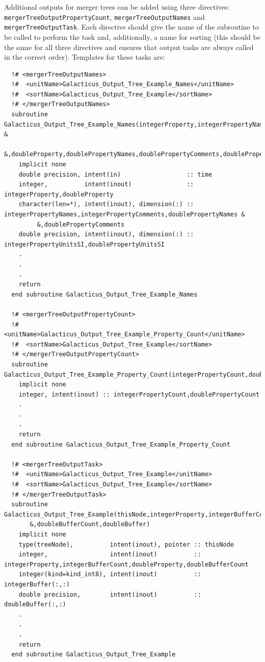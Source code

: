 Additional outputs for merger trees can be added using three directives: {\tt mergerTreeOutputPropertyCount}, {\tt mergerTreeOutputNames} and {\tt mergerTreeOutputTask}. Each directive should give the name of the subroutine to be called to perform the task and, additionally, a name for sorting (this should be the same for all three directives and ensures that output tasks are always called in the correct order). Templates for these tasks are:
\begin{verbatim}
  !# <mergerTreeOutputNames>
  !#  <unitName>Galacticus_Output_Tree_Example_Names</unitName>
  !#  <sortName>Galacticus_Output_Tree_Example</sortName>
  !# </mergerTreeOutputNames>
  subroutine Galacticus_Output_Tree_Example_Names(integerProperty,integerPropertyNames,integerPropertyComments,integerPropertyUnitsSI &
       &,doubleProperty,doublePropertyNames,doublePropertyComments,doublePropertyUnitsSI,time)
    implicit none
    double precision, intent(in)                  :: time
    integer,          intent(inout)               :: integerProperty,doubleProperty
    character(len=*), intent(inout), dimension(:) :: integerPropertyNames,integerPropertyComments,doublePropertyNames &
         &,doublePropertyComments
    double precision, intent(inout), dimension(:) :: integerPropertyUnitsSI,doublePropertyUnitsSI
    .
    .
    .
    return
  end subroutine Galacticus_Output_Tree_Example_Names

  !# <mergerTreeOutputPropertyCount>
  !#  <unitName>Galacticus_Output_Tree_Example_Property_Count</unitName>
  !#  <sortName>Galacticus_Output_Tree_Example</sortName>
  !# </mergerTreeOutputPropertyCount>
  subroutine Galacticus_Output_Tree_Example_Property_Count(integerPropertyCount,doublePropertyCount)
    implicit none
    integer, intent(inout) :: integerPropertyCount,doublePropertyCount
    .
    .
    .
    return
  end subroutine Galacticus_Output_Tree_Example_Property_Count

  !# <mergerTreeOutputTask>
  !#  <unitName>Galacticus_Output_Tree_Example</unitName>
  !#  <sortName>Galacticus_Output_Tree_Example</sortName>
  !# </mergerTreeOutputTask>
  subroutine Galacticus_Output_Tree_Example(thisNode,integerProperty,integerBufferCount,integerBuffer,doubleProperty&
       &,doubleBufferCount,doubleBuffer)
    implicit none
    type(treeNode),          intent(inout), pointer :: thisNode
    integer,                 intent(inout)          :: integerProperty,integerBufferCount,doubleProperty,doubleBufferCount
    integer(kind=kind_int8), intent(inout)          :: integerBuffer(:,:)
    double precision,        intent(inout)          :: doubleBuffer(:,:)
    .
    .
    .
    return
  end subroutine Galacticus_Output_Tree_Example
\end{verbatim}
